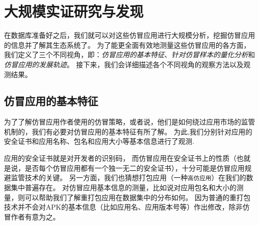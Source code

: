 \chapter{大规模实证研究与发现}
\label{chp:discoveries}

在数据库准备好之后，我们就可以对这些仿冒应用进行大规模分析，挖掘仿冒应用的信息并了解其生态系统了。
为了能更全面有效地测量这些仿冒应用的各方面，我们定义了三个不同视角，即：\emph{仿冒应用的基本特征}、\emph{针对仿冒样本的量化分析}和\emph{仿冒应用的发展轨迹}。
接下来，我们会详细描述各个不同视角的观察方法以及观测结果。

\section{仿冒应用的基本特征}
为了了解仿冒应用作者使用的仿冒策略，或者说，他们是如何绕过应用市场的监管机制的，我们有必要对仿冒应用的基本特征有所了解。
为此,我们分别针对应用的安全证书和应用名称、包名和应用大小等基本信息进行了观测.

应用的安全证书就是对开发者的识别码，
而仿冒应用在安全证书上的性质（也就是说，是否每个仿冒应用都有一个独一无二的安全证书），十分可能是仿冒应用规避监管技术的关键。
另一方面，我们也猜想打包应用（一种\texttt{高仿应用}）在我们的数据集中普遍存在。
对仿冒应用基本信息的测量，比如说对应用包名和大小的测量，则可以帮助我们了解重打包应用在数据集中的分布如何。
因为普通的重打包技术并不会对APK的基本信息（比如应用名、应用版本号等）作出修改，除非仿冒作者有意为之。


